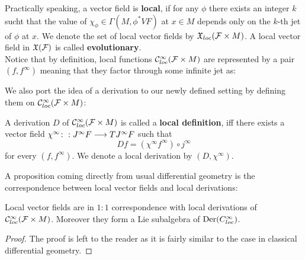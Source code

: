 Practically speaking, a vector field is \textbf{local}, if for any $\phi$ there exists an integer $k$ sucht that the value of $\chi_\phi \in \Gamma(M, \phi^* VF)$ at $x\in M$ depends only on the $k$-th jet of $\phi$ at $x$. We denote the set of local vector fields by $\mathfrak{X}_{loc}({\mathcal{F}} \times M)$. A local vector field in $\mathfrak{X}({\mathcal{F}})$ is called \textbf{evolutionary}.\\

Notice that by definition, local functions $\mathcal{C}^{\infty}_{loc}({\mathcal{F}} \times M)$ are represented by a pair $(f, f^\infty)$ meaning that they factor through some infinite jet as:

\begin{center}
\end{center}

We also port the idea of a derivation to our newly defined setting by defining them on $\mathcal{C}^{\infty}_{loc}({\mathcal{F}} \times M)$:

\begin{definition}
  A derivation $D$ of $\mathcal{C}^{\infty}_{loc}({\mathcal{F}} \times M)$ is called a \textbf{local definition}, iff there exists a vector field $\chi^\infty \colon: J^\infty F \longrightarrow TJ^\infty F$ such that
  $$ Df = (\chi^\infty f^\infty) \circ j^\infty $$
  for every $(f, f^\infty)$. We denote a local derivation by $(D, \chi^\infty)$.
\end{definition}

A proposition coming directly from usual differential geometry is the correspondence between local vector fields and local derivations:

\begin{prop}
  Local vector fields are in $1:1$ correspondence with local derivations of $\mathcal{C}^{\infty}_{loc}({\mathcal{F}} \times M)$. Moreover they form a Lie subalgebra of $\operatorname{Der}(C^\infty_{loc})$.
\begin{proof}
  The proof is left to the reader as it is fairly similar to the case in classical differential geometry.
\end{proof}
\end{prop}

